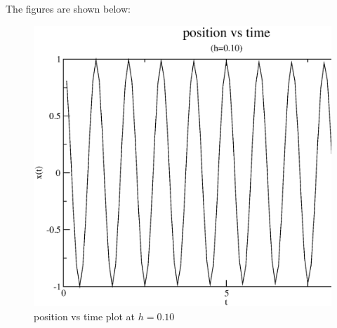 \documentclass[11pt,a4paper,english]{article}
\begin{document}
				    The figures are shown below:\\
	\begin{figure}[h!]
	\centering
	\includegraphics [scale=0.5]{figures/positiontime10.eps}
	\caption{position vs time plot at $h=0.10$ }
	\end{figure}
	\clearpage

    
    
\end{document}
